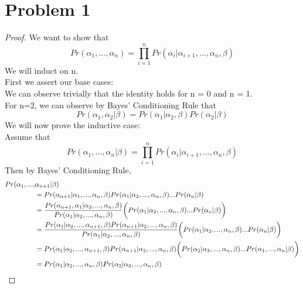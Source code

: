 \documentclass{article}
\begin{document}
\section*{Problem 1}
\begin{proof}
We want to show that 
	\begin{equation*} 
		Pr(\alpha_1, ..., \alpha_n) = \prod_{i=1}^n Pr(\alpha_i | \alpha_{i+1}, ..., \alpha_{n}, \beta)
	\end{equation*}
We will induct on n. \\
First we assert our base cases: \\
\indent We can observe trivially that the identity holds for n = 0 and n = 1. \\
\indent For n=2, we can observe by Bayes' Conditioning Rule that \begin{equation*}
	 Pr(\alpha_1, \alpha_2 | \beta) = Pr(\alpha_1 | \alpha_2, \beta) Pr(\alpha_2 | \beta) \end{equation*}
We will now prove the inductive case: \\
\indent Assume that 
	\begin{equation*} 
		Pr(\alpha_1, ..., \alpha_n | \beta) = \prod_{i=1}^n Pr(\alpha_i | \alpha_{i+1}, ..., \alpha_{n}, \beta)
	\end{equation*}
	Then by Bayes' Conditioning Rule,
	 \begin{align*}
		Pr(\alpha_1, ..., &\alpha_{n+1} | \beta) \\
			\indent &= Pr(\alpha_{n+1} | \alpha_1, ..., \alpha_n, \beta) 
				Pr(\alpha_1 | \alpha_2, ..., \alpha_n, \beta) ... Pr(\alpha_n | \beta) \\
			&= \frac {Pr(\alpha_{n+1}, \alpha_1 | \alpha_2, ..., \alpha_n, \beta)} 
				     {Pr(\alpha_1 | \alpha_2, ..., \alpha_n, \beta)}
				\biggr( Pr(\alpha_1 | \alpha_2, ..., \alpha_n, \beta) ... Pr(\alpha_n | \beta) \biggr)\\
			&= \frac {Pr(\alpha_1 | \alpha_2, ..., \alpha_{n+1}, \beta) 
					Pr(\alpha_{n+1} | \alpha_2, ..., \alpha_n, \beta)}
				     {Pr(\alpha_1 | \alpha_2, ..., \alpha_n, \beta)}
				\biggr( Pr(\alpha_1 | \alpha_2, ..., \alpha_n, \beta) ... Pr(\alpha_n | \beta) \biggr)\\
			&= Pr(\alpha_1 | \alpha_2, ..., \alpha_{n+1}, \beta) Pr(\alpha_{n+1} | \alpha_2, ..., \alpha_n, \beta)
				\biggr( Pr(\alpha_2 | \alpha_3, ..., \alpha_n, \beta) ... Pr(\alpha_1, ..., \alpha_n | \beta) \biggr)\\
			&= Pr(\alpha_1 | \alpha_2, ..., \alpha_n, \beta)
				Pr(\alpha_2 | \alpha_3, ..., \alpha_n, \beta)

\end{align*}
\end{proof}
\end{document}

